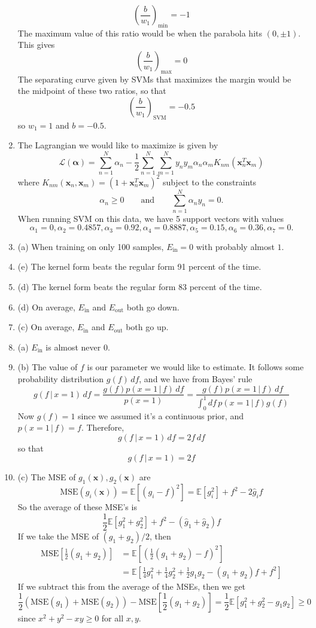 \documentclass[12pt]{article}
\newcommand{\Ein}{E_{\text{in}}}
\newcommand{\Eout}{E_{\text{out}}}
\newcommand{\x}{\mathbf{x}}
\newcommand{\E}{\mathbb{E}}
\begin{document}
\begin{enumerate}[leftmargin=*]
\[ \left( \frac{b}{w_1} \right)_{\text{min}} = - 1 \]
The maximum value of this ratio would be when the parabola hits $(0, \pm 1)$. This gives
\[ \left( \frac{b}{w_1} \right)_{\text{max}} = 0 \]
The separating curve given by SVMs that maximizes the margin would be the midpoint of these two ratios, so that
\[ \left( \frac{b}{w_1} \right)_{\text{SVM}} = -0.5 \]
so $w_1 = 1$ and $b = -0.5$.
\item The Lagrangian we would like to maximize is given by
\[ \mathcal L (\mathbf \alpha) = \sum_{n = 1}^N \alpha_n - \frac{1}{2} \sum_{n = 1}^N \sum_{m = 1}^N y_n y_m \alpha_n \alpha_m K_{n m} (\mathbf x_n^T \mathbf x_m) \]
where $K_{nm}(\mathbf x_n, \mathbf x_m) = (1 + \mathbf x_n^T \mathbf x_m)^2$ subject to the constraints
\[ \alpha_n \geq 0 \qquad \text{and} \qquad \sum_{n = 1}^N \alpha_n y_n = 0.\]
When running SVM on this data, we have 5 support vectors with values
\[ \alpha_1 = 0, \alpha_2 = 0.4857, \alpha_3 = 0.92, \alpha_4 = 0.8887, \alpha_5 = 0.15, \alpha_6 = 0.36, \alpha_7 = 0. \]
\item (a) When training on only 100 samples, $\Ein = 0$ with probably almost $1.$
\item (e) The kernel form beats the regular form 91 percent of the time.
\item (d) The kernel form beats the regular form 83 percent of the time.
\item (d) On average, $\Ein$ and $\Eout$ both go down.
\item (c) On average, $\Ein$ and $\Eout$ both go up.
\item (a) $\Ein$ is almost never 0.
\item (b) The value of $f$ is our parameter we would like to estimate. It follows some probability distribution $g(f) \, df$, and we have from Bayes' rule
\[ g(f \, | \, x = 1) \, df = \frac{g(f) p(x = 1 \, | \, f) \, df}{p(x = 1)} = \frac{g(f) p(x = 1 \, | \, f) \, df}{\int_0^1 df \, p(x = 1 \, | \, f) g(f)} \]
Now $g(f) = 1$ since we assumed it's a continuous prior, and $p(x = 1 \, | \, f) = f$. Therefore,
\[ g(f \, | \, x = 1) \, df = 2 f \, df \]
so that
\[ g(f \, | \, x = 1) = 2 f \]
\item (c) The MSE of $g_1(\x), g_2(\x)$ are
\[ \text{MSE}(g_i(\x)) = \E [(g_i - f)^2] = \E [ g_i^2] + f^2 - 2 \hat g_i f \]
So the average of these MSE's is
\[ \frac{1}{2} \E[g_1^2 + g_2^2] + f^2 - (\hat g_1 + \hat g_2) f\]
If we take the MSE of $(g_1 + g_2) / 2$, then
\begin{align*}
\text{MSE} \left[ \frac{1}{2} \left( g_1 + g_2 \right) \right] &= \E \left[ \left( \frac{1}{2} \left( g_1 + g_2 \right) - f \right)^2 \right] \\
&= \E \left[ \frac{1}{4} g_1^2 + \frac{1}{4} g_2^2 + \frac{1}{2} g_1 g_2 - (g_1 + g_2) f + f^2 \right]
\end{align*}
If we subtract this from the average of the MSEs, then we get
\[ \frac{1}{2} \left(\text{MSE}(g_1) + \text{MSE}(g_2) \right) - \text{MSE} \left[ \frac{1}{2} \left( g_1 + g_2 \right) \right] = \frac{1}{2} \E \left[ g_1^2 + g_2^2 - g_1 g_2 \right] \geq 0 \]
since $x^2 + y^2 - x y \geq 0$ for all $x, y$.
\end{enumerate}
\end{document}
